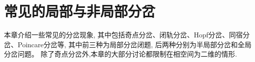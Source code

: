 \chapter{常见的局部与非局部分岔}
本章介绍一些常见的分岔现象,
其中包括奇点分岔、闭轨分岔、Hopf分岔、同宿分岔、Poincare分岔等,
其中前三种为局部分岔闭题,
后两种分别为半局部分岔和全局分岔问题。
除了奇点分岔外,本章的大部分讨论都限制在相空间为二维的情形.